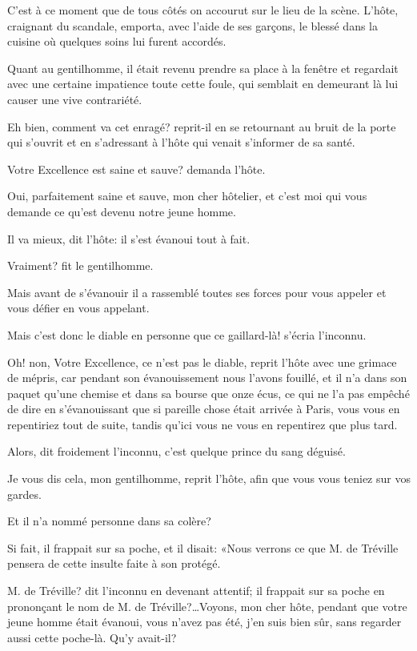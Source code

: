C'est à ce moment que de tous côtés on accourut sur le lieu de la scène. L'hôte, craignant du scandale, emporta, avec l'aide de ses garçons, le blessé dans la cuisine où quelques soins lui furent accordés. 

Quant au gentilhomme, il était revenu prendre sa place à la fenêtre et regardait avec une certaine impatience toute cette foule, qui semblait en demeurant là lui causer une vive contrariété. 

\speak  Eh bien, comment va cet enragé? reprit-il en se retournant au bruit de la porte qui s'ouvrit et en s'adressant à l'hôte qui venait s'informer de sa santé. 

\speak  Votre Excellence est saine et sauve? demanda l'hôte. 

\speak  Oui, parfaitement saine et sauve, mon cher hôtelier, et c'est moi qui vous demande ce qu'est devenu notre jeune homme. 

\speak  Il va mieux, dit l'hôte: il s'est évanoui tout à fait. 

\speak  Vraiment? fit le gentilhomme. 

\speak  Mais avant de s'évanouir il a rassemblé toutes ses forces pour vous appeler et vous défier en vous appelant. 

\speak  Mais c'est donc le diable en personne que ce gaillard-là! s'écria l'inconnu. 

\speak  Oh! non, Votre Excellence, ce n'est pas le diable, reprit l'hôte avec une grimace de mépris, car pendant son évanouissement nous l'avons fouillé, et il n'a dans son paquet qu'une chemise et dans sa bourse que onze écus, ce qui ne l'a pas empêché de dire en s'évanouissant que si pareille chose était arrivée à Paris, vous vous en repentiriez tout de suite, tandis qu'ici vous ne vous en repentirez que plus tard. 

\speak  Alors, dit froidement l'inconnu, c'est quelque prince du sang déguisé. 

\speak  Je vous dis cela, mon gentilhomme, reprit l'hôte, afin que vous vous teniez sur vos gardes. 

\speak  Et il n'a nommé personne dans sa colère? 

\speak  Si fait, il frappait sur sa poche, et il disait: «Nous verrons ce que M. de Tréville pensera de cette insulte faite à son protégé. 

\speak  M. de Tréville? dit l'inconnu en devenant attentif; il frappait sur sa poche en prononçant le nom de M. de Tréville?\dots Voyons, mon cher hôte, pendant que votre jeune homme était évanoui, vous n'avez pas été, j'en suis bien sûr, sans regarder aussi cette poche-là. Qu'y avait-il? 

